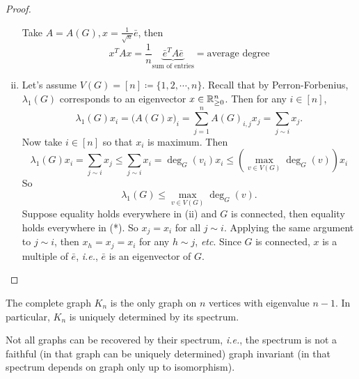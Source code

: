 \begin{proof}
\begin{enumerate}[(i)]
Take \(A=A(G), x=\frac{1}{\sqrt{n}}\bar e\), then
\[ x^T Ax=\frac{1}{n} \underbrace{\bar e^T A\bar e}_{\text{sum of entries}}=\text{average degree} \]
\item Let's assume \(V(G)=[n]\coloneqq\{1,2,\cdots,n\}\).
Recall that by Perron-Forbenius, \(\lambda_1(G)\) corresponds to an eigenvector \(x\in\mathbb{R}_{\ge0}^n\).
Then for any \(i\in[n]\),
\[ \lambda_1(G) x_i=\Big(A(G)x\Big)_i=\sum_{j=1}^{n} A(G)_{i,j}x_j=\sum_{j\sim i}x_j. \]
Now take \(i\in[n]\) so that \(x_i\) is maximum.
Then
\[ \lambda_1(G)x_i=\sum_{j\sim i}x_j\leq \sum_{j\sim i}x_i=\deg_G(v_i) x_i\leq \left( \max_{v\in V(G)}\deg_G(v) \right) x_i \tag{*} \]
So
\[ \lambda_1(G)\leq\max_{v\in V(G)}\deg_G(v). \]
Suppose equality holds everywhere in (ii) and \(G\) is connected, then equality holds everywhere in (*).
So \(x_j=x_i\) for all \(j\sim i\).
Applying the same argument to \(j\sim i\), then \(x_h=x_j=x_i\) for any \(h\sim j\), \textit{etc}.
Since \(G\) is connected, \(x\) is a multiple of \(\bar e\), \textit{i.e.}, \(\bar e\) is an eigenvector of \(G\).
\end{enumerate}
\end{proof}
\begin{corollary}
The complete graph \(K_n\) is the only graph on \(n\) vertices with eigenvalue \(n-1\).
In particular, \(K_n\) is uniquely determined by its spectrum.
\end{corollary}
\begin{remark}
Not all graphs can be recovered by their spectrum, \textit{i.e.}, the spectrum is not a faithful (in that graph can be uniquely determined) graph invariant (in that spectrum depends on graph only up to isomorphism).
\end{remark}
